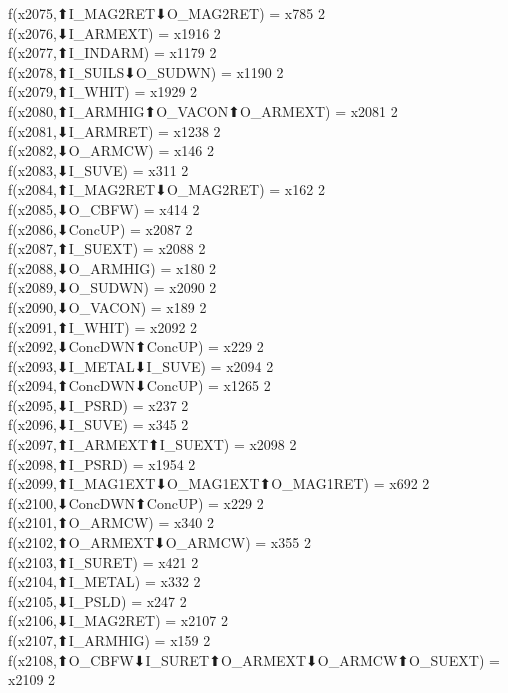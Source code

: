 f(x2075,⬆I_MAG2RET⬇O_MAG2RET) = x785 {2} \\
f(x2076,⬇I_ARMEXT) = x1916 {2} \\
f(x2077,⬆I_INDARM) = x1179 {2} \\
f(x2078,⬆I_SUILS⬇O_SUDWN) = x1190 {2} \\
f(x2079,⬆I_WHIT) = x1929 {2} \\
f(x2080,⬆I_ARMHIG⬆O_VACON⬆O_ARMEXT) = x2081 {2} \\
f(x2081,⬇I_ARMRET) = x1238 {2} \\
f(x2082,⬇O_ARMCW) = x146 {2} \\
f(x2083,⬇I_SUVE) = x311 {2} \\
f(x2084,⬆I_MAG2RET⬇O_MAG2RET) = x162 {2} \\
f(x2085,⬇O_CBFW) = x414 {2} \\
f(x2086,⬇ConcUP) = x2087 {2} \\
f(x2087,⬆I_SUEXT) = x2088 {2} \\
f(x2088,⬇O_ARMHIG) = x180 {2} \\
f(x2089,⬇O_SUDWN) = x2090 {2} \\
f(x2090,⬇O_VACON) = x189 {2} \\
f(x2091,⬆I_WHIT) = x2092 {2} \\
f(x2092,⬇ConcDWN⬆ConcUP) = x229 {2} \\
f(x2093,⬇I_METAL⬇I_SUVE) = x2094 {2} \\
f(x2094,⬆ConcDWN⬇ConcUP) = x1265 {2} \\
f(x2095,⬇I_PSRD) = x237 {2} \\
f(x2096,⬇I_SUVE) = x345 {2} \\
f(x2097,⬆I_ARMEXT⬆I_SUEXT) = x2098 {2} \\
f(x2098,⬆I_PSRD) = x1954 {2} \\
f(x2099,⬆I_MAG1EXT⬇O_MAG1EXT⬆O_MAG1RET) = x692 {2} \\
f(x2100,⬇ConcDWN⬆ConcUP) = x229 {2} \\
f(x2101,⬆O_ARMCW) = x340 {2} \\
f(x2102,⬆O_ARMEXT⬇O_ARMCW) = x355 {2} \\
f(x2103,⬆I_SURET) = x421 {2} \\
f(x2104,⬆I_METAL) = x332 {2} \\
f(x2105,⬇I_PSLD) = x247 {2} \\
f(x2106,⬇I_MAG2RET) = x2107 {2} \\
f(x2107,⬆I_ARMHIG) = x159 {2} \\
f(x2108,⬆O_CBFW⬇I_SURET⬆O_ARMEXT⬇O_ARMCW⬆O_SUEXT) = x2109 {2} \\
